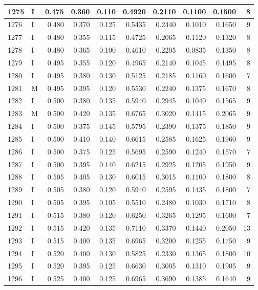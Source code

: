\documentclass[9pt,twocolumn,twoside,]{pnas-new}
\begin{document}
\begin{tabular}{l|l|r|r|r|r|r|r|r|r}
\hline
1275 & I & 0.475 & 0.360 & 0.110 & 0.4920 & 0.2110 & 0.1100 & 0.1500 & 8\\
\hline
1276 & I & 0.480 & 0.370 & 0.125 & 0.5435 & 0.2440 & 0.1010 & 0.1650 & 9\\
\hline
1277 & I & 0.480 & 0.355 & 0.115 & 0.4725 & 0.2065 & 0.1120 & 0.1320 & 8\\
\hline
1278 & I & 0.480 & 0.365 & 0.100 & 0.4610 & 0.2205 & 0.0835 & 0.1350 & 8\\
\hline
1279 & I & 0.495 & 0.355 & 0.120 & 0.4965 & 0.2140 & 0.1045 & 0.1495 & 8\\
\hline
1280 & I & 0.495 & 0.380 & 0.130 & 0.5125 & 0.2185 & 0.1160 & 0.1600 & 7\\
\hline
1281 & M & 0.495 & 0.395 & 0.120 & 0.5530 & 0.2240 & 0.1375 & 0.1670 & 8\\
\hline
1282 & I & 0.500 & 0.380 & 0.135 & 0.5940 & 0.2945 & 0.1040 & 0.1565 & 9\\
\hline
1283 & M & 0.500 & 0.420 & 0.135 & 0.6765 & 0.3020 & 0.1415 & 0.2065 & 9\\
\hline
1284 & I & 0.500 & 0.375 & 0.145 & 0.5795 & 0.2390 & 0.1375 & 0.1850 & 9\\
\hline
1285 & I & 0.500 & 0.410 & 0.140 & 0.6615 & 0.2585 & 0.1625 & 0.1960 & 9\\
\hline
1286 & I & 0.500 & 0.375 & 0.125 & 0.5695 & 0.2590 & 0.1240 & 0.1570 & 7\\
\hline
1287 & I & 0.500 & 0.395 & 0.140 & 0.6215 & 0.2925 & 0.1205 & 0.1950 & 9\\
\hline
1288 & I & 0.505 & 0.405 & 0.130 & 0.6015 & 0.3015 & 0.1100 & 0.1800 & 8\\
\hline
1289 & I & 0.505 & 0.380 & 0.120 & 0.5940 & 0.2595 & 0.1435 & 0.1800 & 7\\
\hline
1290 & I & 0.505 & 0.395 & 0.105 & 0.5510 & 0.2480 & 0.1030 & 0.1710 & 8\\
\hline
1291 & I & 0.515 & 0.380 & 0.120 & 0.6250 & 0.3265 & 0.1295 & 0.1600 & 7\\
\hline
1292 & I & 0.515 & 0.420 & 0.135 & 0.7110 & 0.3370 & 0.1440 & 0.2050 & 13\\
\hline
1293 & I & 0.515 & 0.400 & 0.135 & 0.6965 & 0.3200 & 0.1255 & 0.1750 & 9\\
\hline
1294 & I & 0.520 & 0.400 & 0.130 & 0.5825 & 0.2330 & 0.1365 & 0.1800 & 10\\
\hline
1295 & I & 0.520 & 0.395 & 0.125 & 0.6630 & 0.3005 & 0.1310 & 0.1905 & 9\\
\hline
1296 & I & 0.525 & 0.400 & 0.125 & 0.6965 & 0.3690 & 0.1385 & 0.1640 & 9\\

\end{tabular}
\end{document}
